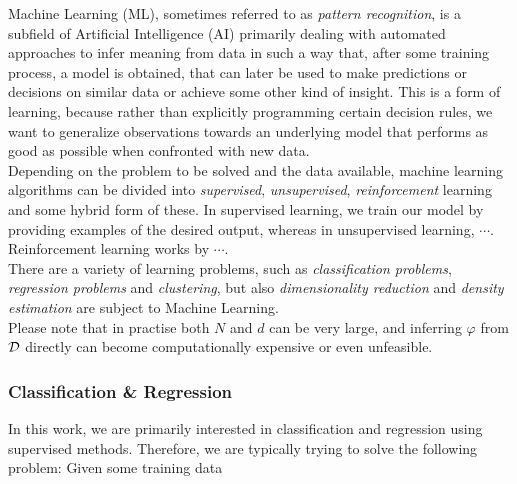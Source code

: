 Machine Learning (ML), sometimes referred to as \emph{pattern recognition}, is a subfield of Artificial Intelligence (AI) primarily dealing with automated approaches to infer meaning from data in such a way that, after some training process, a model is obtained, that can later be used to make predictions or decisions on similar data or achieve some other kind of insight. This is a form of learning, because rather than explicitly programming certain decision rules, we want to generalize observations towards an underlying model that performs as good as possible when confronted with new data.\\

Depending on the problem to be solved and the data available, machine learning algorithms can be divided into \emph{supervised}, \emph{unsupervised}, \emph{reinforcement} learning and some hybrid form of these. In supervised learning, we train our model by providing examples of the desired output, whereas in unsupervised learning, $\cdots$. Reinforcement learning works by $\cdots$.\\

There are a variety of learning problems, such as \emph{classification problems}, \emph{regression problems} and \emph{clustering}, but also \emph{dimensionality reduction} and \emph{density estimation} are subject to Machine Learning.\\


Please note that in practise both $N$ and $d$ can be very large, and inferring $\varphi$ from $\mathcal{D}$ directly can become computationally expensive or even unfeasible.

\subsubsection{Classification \& Regression}

In this work, we are primarily interested in classification and regression using supervised methods. Therefore, we are typically trying to solve the following problem: Given some training data

